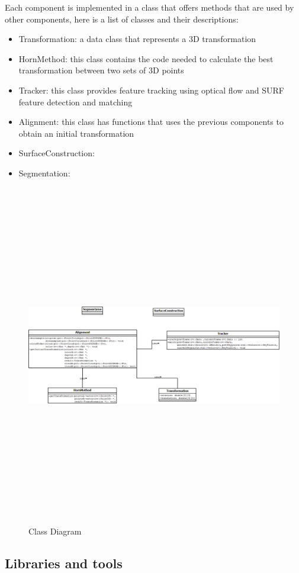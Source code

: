 Each component is implemented in a class that offers methods that are used by other components, here is a list of classes and their descriptions:

\begin{itemize}
  \item Transformation: a data class that represents a 3D transformation
  \item HornMethod: this class contains the code needed to calculate the best transformation between two sets of 3D points
  \item Tracker: this class provides feature tracking using optical flow and 	SURF feature detection and matching
  \item Alignment: this class has functions that uses the previous components to obtain an initial transformation
  \item SurfaceConstruction:
  \item Segmentation:

\end{itemize}

\begin{figure}[H]
\centering
\includegraphics[width=150mm,height=150mm]{System_Analysis_and_Design/class_diagram.png}
\caption{Class Diagram}
\label{fig:class_diagram}
\end{figure}

\subsection{Libraries and tools}
